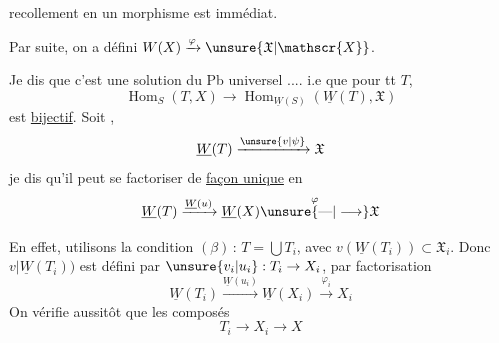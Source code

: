 recollement en un morphisme est immédiat.

Par suite, on a défini $W(X)\xrightarrow{\varphi}\unsure{\mathfrak{X}|\mathscr{X}}$.

Je dis que c'est une solution du Pb universel .... i.e que pour tt $T$,
\[
\operatorname{Hom}_S(T,X)\longrightarrow
\operatorname{Hom}_{\underline W(S)}(\underline W(T),\mathfrak{X})
\]
est \uline{bijectif}. Soit ,
\[
\underline W(T)\xrightarrow{\unsure{v|\psi}}\mathfrak{X}
\]
je dis qu'il peut se factoriser de \uline{façon unique} en
\[
\underline W(T)\xrightarrow{\underline W(u)}\underline W(X)
\overset{\varphi}{\unsure{\text{---}|\longrightarrow}}\mathfrak{X}
\]

En effet,     utilisons la condition $(\beta)$\,: $T=\bigcup T_i$, avec $v(\underline W(T_i))\subset\mathfrak{X}_i$. Donc $v|\underline W(T_i))$ est défini par $\unsure{v_i|u_i}:T_i\to X_i$, par factorisation
\[
\underline W(T_i)\xrightarrow{\underline W(u_i)}
 \underline W(X_i)\xrightarrow{\varphi_i}X_i
\]
On vérifie aussitôt que les composés
\[
 T_i\longrightarrow X_i\longrightarrow X
\]
